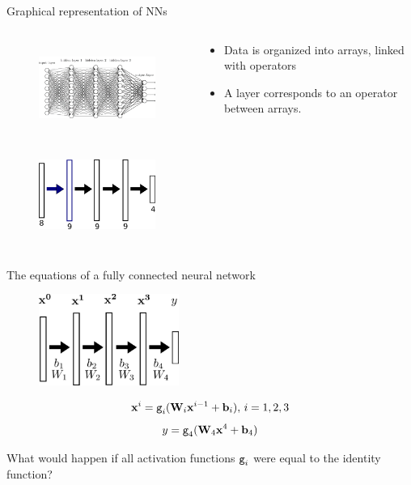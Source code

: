 \documentclass[xcolor=pdftex,dvipsnames,table,mathserif]{beamer}
\begin{document}
\begin{frame}{Graphical representation of NNs}

  \begin{columns}
    \begin{column}{.5\textwidth}
      \begin{figure}
        \includegraphics[height=3cm]{network.png}
      \end{figure}
      \begin{figure}
        \includegraphics[height=3cm]{nn_representation}
      \end{figure}
    \end{column}

    \begin{column}{.5\textwidth}
      \begin{itemize}
      \item Data is organized into arrays, linked with operators
      \item A layer corresponds to an operator between arrays.
      \end{itemize}
    \end{column}
  \end{columns}


\end{frame}


\begin{frame}{The equations of a fully connected neural network}

  \begin{figure}
    \includegraphics[height=3cm]{nn_representation2}
  \end{figure}

  \begin{block}{}
    \[\mathbf{x}^i = \texttt{g}_i(\mathbf{W}_i\mathbf{x}^{i-1} + \mathbf{b}_i),\, i= 1, 2, 3 \]
    \[y = \texttt{g}_4(\mathbf{W}_4\mathbf{x}^4 + \mathbf{b}_4)\]
  \end{block}

  \pause

  What would happen if all activation functions $\texttt{g}_i$ were equal to the identity function?

\end{frame}
\end{document}
